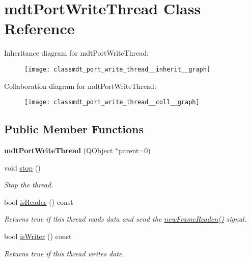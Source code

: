 \hypertarget{classmdt_port_write_thread}{
\section{mdtPortWriteThread Class Reference}
\label{classmdt_port_write_thread}
}


Inheritance diagram for mdtPortWriteThread:\nopagebreak
\begin{figure}[H]
\begin{center}
\leavevmode
\texttt{[image: classmdt\_port\_write\_thread\_\_inherit\_\_graph]}
\end{center}
\end{figure}


Collaboration diagram for mdtPortWriteThread:\nopagebreak
\begin{figure}[H]
\begin{center}
\leavevmode
\texttt{[image: classmdt\_port\_write\_thread\_\_coll\_\_graph]}
\end{center}
\end{figure}
\subsection*{Public Member Functions}
\begin{DoxyCompactItemize}
\item 
\hypertarget{classmdt_port_write_thread_a994b96eafdd721ccff2f2410a5abd5e3}{
{\bfseries mdtPortWriteThread} (QObject $\ast$parent=0)}
\label{classmdt_port_write_thread_a994b96eafdd721ccff2f2410a5abd5e3}

\item 
\hypertarget{classmdt_port_write_thread_a69702ab3a95c238fb451f866efc7cb34}{
void \hyperlink{classmdt_port_write_thread_a69702ab3a95c238fb451f866efc7cb34}{stop} ()}
\label{classmdt_port_write_thread_a69702ab3a95c238fb451f866efc7cb34}

\begin{DoxyCompactList}\small\item\em Stop the thread. \end{DoxyCompactList}\item 
bool \hyperlink{classmdt_port_write_thread_ac37bb988773f624def51e841998a2f1e}{isReader} () const 
\begin{DoxyCompactList}\small\item\em Returns true if this thread reads data and send the \hyperlink{classmdt_port_thread_a7fc2245c753fd65e1beffec211c41461}{newFrameReaden()} signal. \end{DoxyCompactList}\item 
bool \hyperlink{classmdt_port_write_thread_ad2508c3a2433383e2de705e9f3d2e602}{isWriter} () const 
\begin{DoxyCompactList}\small\item\em Returns true if this thread writes date. \end{DoxyCompactList}\end{DoxyCompactItemize}


